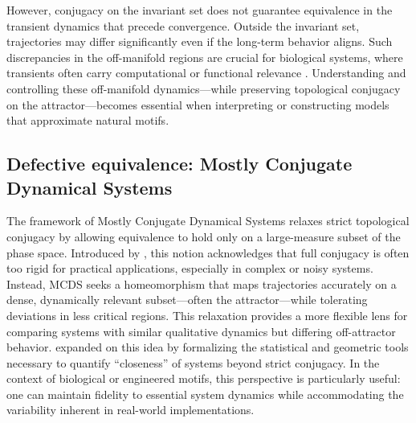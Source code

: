 \documentclass{article}
\theoremstyle{definition} \newtheorem{definition}{Definition}  \newtheorem{example}{Example}
\theoremstyle{remark} \newtheorem{remark}{Remark}
\newcounter{ct}
\begin{document}
 However, conjugacy on the invariant set does not guarantee equivalence in the transient dynamics that precede convergence. Outside the invariant set, trajectories may differ significantly even if the long-term behavior aligns. Such discrepancies in the off-manifold regions are crucial for biological systems, where transients often carry computational or functional relevance \citep{koch2024biological}. Understanding and controlling these off-manifold dynamics---while preserving topological conjugacy on the attractor---becomes essential when interpreting or constructing models that approximate natural motifs.
 
% 


\subsection{Defective equivalence: Mostly Conjugate Dynamical Systems}
The framework of Mostly Conjugate Dynamical Systems relaxes strict topological conjugacy by allowing equivalence to hold only on a large-measure subset of the phase space.
Introduced by \citet{skufca2007relaxing, skufca2008mostlyconjugate}, this notion acknowledges that full conjugacy is often too rigid for practical applications, especially in complex or noisy systems. 
Instead, MCDS seeks a homeomorphism that maps trajectories accurately on a dense, dynamically relevant subset---often the attractor---while tolerating deviations in less critical regions.
This relaxation provides a more flexible lens for comparing systems with similar qualitative dynamics but differing off-attractor behavior. 
\citet{bollt2010comparing} expanded on this idea by formalizing the statistical and geometric tools necessary to quantify ``closeness'' of systems beyond strict conjugacy. In the context of biological or engineered motifs, this perspective is particularly useful: one can maintain fidelity to essential system dynamics while accommodating the variability inherent in real-world implementations.
\end{document}
